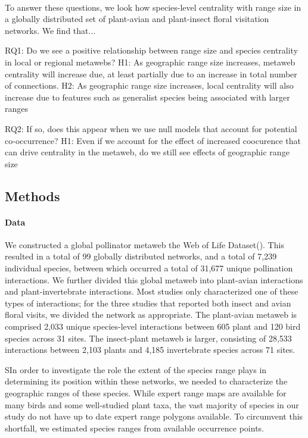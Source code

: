 \documentclass[12pt]{article}
\begin{document}
\paragraph*{}
To answer these questions, we look how species-level centrality with range size in a globally distributed set of plant-avian and plant-insect floral visitation networks. We find that...

\vspace{30pt}
RQ1: Do we see a positive relationship between range size and species centrality in local or regional metawebs?
    H1: As geographic range size increases, metaweb centrality will increase due, at least partially due to an increase in total number of connections.
    H2: As geographic range size increases, local centrality will also increase due to features such as generalist species being associated with larger ranges

RQ2: If so, does this appear when we use null models that account for potential co-occurrence?
    H1: Even if we account for the effect of increased coocurence that can drive centrality in the metaweb, do we still see effects of geographic range size






\subsection*{Methods}

\paragraph*{Data}
We constructed a global pollinator metaweb the Web of Life Dataset(\citep{}). This resulted in a total of 99 globally distributed networks, and a total of 7,239 individual species, between which occurred a total of 31,677 unique pollination interactions. We further divided this global metaweb into plant-avian interactions and plant-invertebrate interactions. Most studies only characterized one of these types of interactions; for the three studies that reported both insect and avian floral visits, we divided the network as appropriate. The plant-avian metaweb is comprised 2,033 unique species-level interactions between 605 plant and 120 bird species across 31 sites. The insect-plant metaweb is larger, consisting of 28,533 interactions between 2,103 plants and 4,185 invertebrate species across 71 sites. 

SIn order to investigate the role the extent of the species range plays in determining its position within these networks, we needed to characterize the geographic ranges of these species. While expert range maps are available for many birds and some well-studied plant taxa, the vast majority of species in our study do not have up to date expert range polygons available. To circumvent this shortfall, we estimated species ranges from available occurrence points. 
\end{document}
